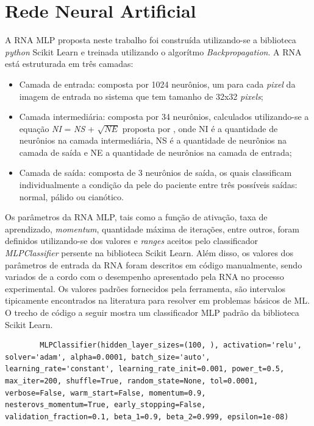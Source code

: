 \section{Rede Neural Artificial}

	A RNA MLP proposta neste trabalho foi construída utilizando-se a biblioteca \textit{python} Scikit Learn e treinada utilizando o algorítmo \textit{Backpropagation}. A RNA está estruturada em três camadas:

	\begin{itemize}
		\item Camada de entrada: composta por 1024 neurônios, um para cada \textit{pixel} da imagem de entrada no sistema que tem tamanho de 32x32 \textit{pixels};
		\item Camada intermediária: composta por 34 neurônios, calculados utilizando-se a equação \textit{NI} = \textit{NS} + $\sqrt{\textit{NE}}$ proposta por \cite{Eberhart1991}, onde NI é a quantidade de neurônios na camada intermediária, NS é a quantidade de neurônios na camada de saída e NE a quantidade de neurônios na camada de entrada;
		\item Camada de saída: composta de 3 neurônios de saída, os quais classificam individualmente a condição da pele do paciente entre três possíveis saídas: normal, pálido ou cianótico.
	\end{itemize}

	Os parâmetros da RNA MLP, tais como a função de ativação, taxa de aprendizado, \textit{momentum}, quantidade máxima de iterações, entre outros, foram definidos utilizando-se dos valores e \textit{ranges} aceitos pelo classificador \textit{MLPClassifier} persente na biblioteca Scikit Learn. Além disso, os valores dos parâmetros de entrada da RNA foram descritos em código manualmente, sendo variados de a cordo com o desempenho apresentado pela RNA no processo experimental. Os valores padrões fornecidos pela ferramenta, são intervalos tipicamente encontrados na literatura para resolver em problemas básicos de ML. O trecho de código a seguir mostra um classificador MLP padrão da biblioteca Scikit Learn.

	\begin{lstlisting}
		MLPClassifier(hidden_layer_sizes=(100, ), activation='relu', solver='adam', alpha=0.0001, batch_size='auto', learning_rate='constant', learning_rate_init=0.001, power_t=0.5, max_iter=200, shuffle=True, random_state=None, tol=0.0001, verbose=False, warm_start=False, momentum=0.9, nesterovs_momentum=True, early_stopping=False, validation_fraction=0.1, beta_1=0.9, beta_2=0.999, epsilon=1e-08)
	\end{lstlisting} 

